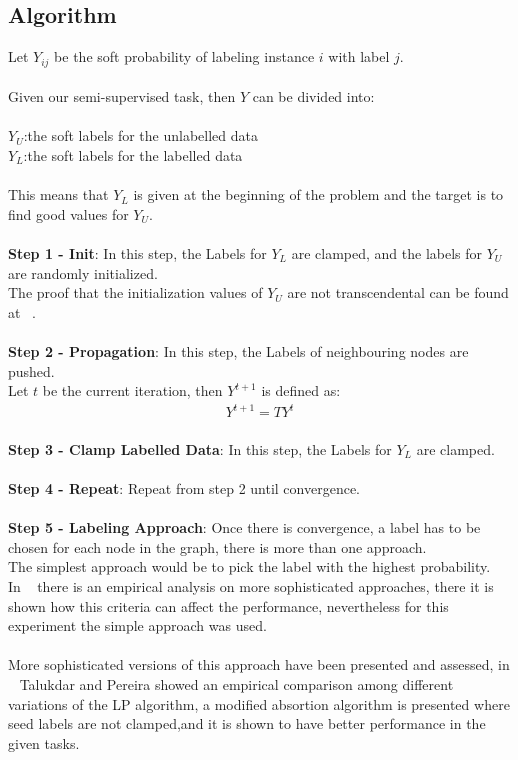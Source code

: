 \documentclass[4pt,a4paper,twocolumn]{article}
\begin{document}
\subsection{Algorithm}
Let $Y_{ij}$ be the soft probability of labeling instance $i$ with label $j$.\\
\\
Given our semi-supervised task, then $Y$ can be divided into:\\
\\
$Y_{U}$:the soft labels for the unlabelled data\\
$Y_{L}$:the soft labels for the labelled data\\
\\
This means that $Y_{L}$ is given at the beginning of the problem
and the target is to find good values for $Y_{U}$.\\
\\
\textbf{Step 1 - Init}: In this step, the Labels for $Y_{L}$ are clamped, and the labels for $Y_{U}$ are randomly initialized.\\
The proof that the initialization values of $Y_{U}$ are not transcendental can be found at ~\cite{Zhu:2005:SLG:1104523}.\\
\\
\textbf{Step 2 - Propagation}: In this step, the Labels of neighbouring nodes are pushed.\\
Let $t$ be the current iteration, then $Y^{t+1}$ is defined as:
\begin{align}
Y^{t+1} = T Y^{t}
\end{align}
\\
\textbf{Step 3 - Clamp Labelled Data}: In this step, the Labels for $Y_{L}$ are clamped.\\
\\
\textbf{Step 4 - Repeat}: Repeat from step 2 until convergence.\\
\\
\textbf{Step 5 - Labeling Approach}: Once there is convergence, a label has to be chosen for each node in the graph, there is more than one approach.\\
The simplest approach would be to pick the label with the highest probability. \\
In ~\cite{Zhu:2005:SLG:1104523} there is an empirical analysis on more sophisticated approaches, there it is shown how this criteria can affect the performance, nevertheless for this experiment the simple approach was used.\\
\\
More sophisticated versions of this approach have been presented and assessed, in ~\cite{Talukdar:2010:EGS:1858681.1858830} Talukdar and Pereira showed an empirical comparison among different variations of the LP algorithm, a modified absortion algorithm is presented where seed labels are not clamped,and it is shown to have better performance in the given tasks.
\end{document}
